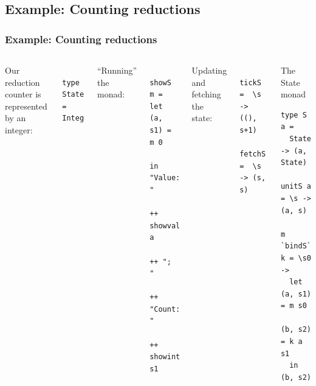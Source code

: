 \documentclass{beamer}
\begin{document}
\subsection{Example: Counting reductions}
\begin{frame}[t, fragile]
  \frametitle{Example: Counting reductions}

  \begin{columns}[t]

Our reduction counter is represented by an integer:
\begin{lstlisting}
  type State = Integer
\end{lstlisting}

"`Running"' the monad:
\begin{lstlisting}
  showS m = let (a, s1) = m 0
            in  "Value: "
             ++ showval a 
             ++ "; " 
             ++ "Count: " 
             ++ showint s1
\end{lstlisting}

Updating and fetching the state:
\begin{lstlisting}
  tickS   =  \s -> ((), s+1)
  fetchS  =  \s -> (s, s)
\end{lstlisting}
    \begin{block}{The State monad}
      
\color{kugrey}
    \begin{lstlisting}[basicstyle=\footnotesize\ttfamily]
type S a = 
  State -> (a, State)

unitS a = \s -> (a, s)

m `bindS` k = \s0 -> 
  let (a, s1) = m s0
      (b, s2) = k a s1
  in (b, s2)
    \end{lstlisting}
    \end{block}
  \end{columns}
\end{frame}
\end{document}
